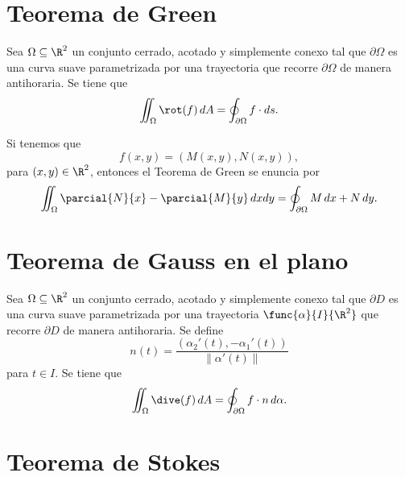\documentclass[a4,11pt]{aleph-notas}
\begin{document}
\section{Teorema de Green}


\begin{teo}
    Sea $\Omega\subseteq \R^2$ un conjunto cerrado, acotado y simplemente conexo tal que $\partial \Omega$ es una curva suave parametrizada por una trayectoria que recorre $\partial \Omega$ de manera antihoraria. Se tiene que
    \[
        \iint_\Omega \rot(f) \,dA = \oint_{\partial \Omega} f\cdot ds.
    \]
\end{teo}

\begin{advertencia}
    Si tenemos que
    \[
        f(x,y)=(M(x,y),N(x,y)),
    \]
    para $(x,y)\in\R^2$, entonces el Teorema de Green se enuncia por
    \[
        \iint_\Omega \parcial{N}{x} - \parcial{M}{y} \,dxdy = \oint_{\partial \Omega} M\, dx+ N\, dy.
    \]
\end{advertencia}


\section{Teorema de Gauss en el plano}


\begin{teo}
    Sea $\Omega\subseteq \R^2$ un conjunto cerrado, acotado y simplemente conexo tal que $\partial D$ es una curva suave parametrizada por una trayectoria $\func{\alpha}{I}{\R^2}$ que recorre $\partial D$ de manera antihoraria. Se define
    \[
        n(t) = \frac{(\alpha_2'(t),- \alpha_1'(t))}{\|\alpha'(t)\|}
    \]
    para $t\in I$. Se tiene que
    \[
        \iint_\Omega \dive(f) \,dA = \oint_{\partial \Omega} f\cdot n\, d\alpha.
    \]
\end{teo}


\section{Teorema de Stokes}
\end{document}
